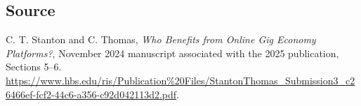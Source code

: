 \documentclass[11pt]{article}
\begin{document}
\subsection*{Source}
C. T. Stanton and C. Thomas, \emph{Who Benefits from Online Gig Economy
Platforms?}, November 2024 manuscript associated with the 2025 publication,
Sections 5--6.
\url{https://www.hbs.edu/ris/Publication%20Files/StantonThomas_Submission3_c26466ef-fcf2-44c6-a356-c92d042113d2.pdf}.
\end{document}

